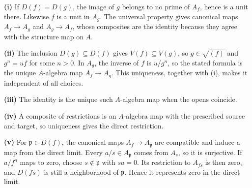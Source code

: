 \textbf{(i)} If $D(f)=D(g)$, the image of $g$ belongs to no prime of $A_f$, hence is a unit there. Likewise $f$ is a unit in $A_g$. The universal property gives canonical maps $A_f\to A_g$ and $A_g\to A_f$, whose composites are the identity because they agree with the structure map on $A$.

\textbf{(ii)} The inclusion $D(g)\subseteq D(f)$ gives $V(f)\subseteq V(g)$, so $g\in\sqrt{(f)}$ and $g^n=uf$ for some $n>0$. In $A_g$, the inverse of $f$ is $u/g^n$, so the stated formula is the unique $A$-algebra map $A_f\to A_g$. This uniqueness, together with (i), makes it independent of all choices.

\textbf{(iii)} The identity is the unique such $A$-algebra map when the opens coincide.

\textbf{(iv)} A composite of restrictions is an $A$-algebra map with the prescribed source and target, so uniqueness gives the direct restriction.

\textbf{(v)} For $\mathfrak p\in D(f)$, the canonical maps $A_f\to A_{\mathfrak p}$ are compatible and induce a map from the direct limit. Every $a/s\in A_{\mathfrak p}$ comes from $A_s$, so it is surjective. If $a/f^n$ maps to zero, choose $s\notin\mathfrak p$ with $sa=0$. Its restriction to $A_{fs}$ is then zero, and $D(fs)$ is still a neighborhood of $\mathfrak p$. Hence it represents zero in the direct limit.
